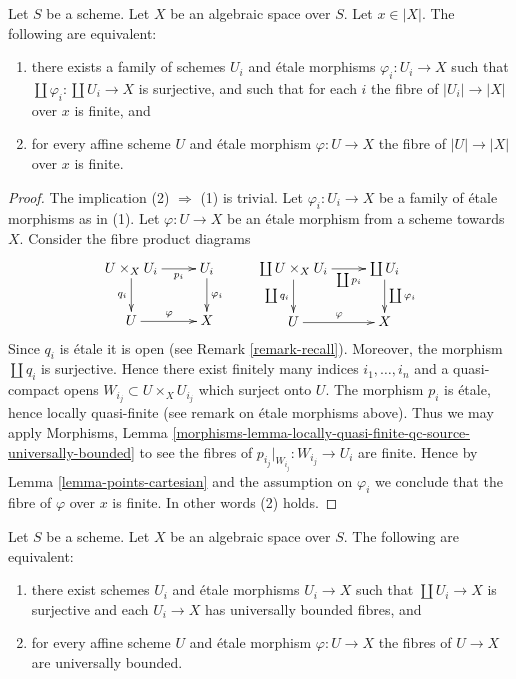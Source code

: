 \begin{lemma}
\label{lemma-U-finite-above-x}
Let $S$ be a scheme. Let $X$ be an algebraic space over $S$.
Let $x \in |X|$. The following are equivalent:
\begin{enumerate}
\item there exists a family of schemes $U_i$ and
\'etale morphisms $\varphi_i : U_i \to X$ such that
$\coprod \varphi_i : \coprod U_i \to X$ is surjective,
and such that for each $i$ the fibre of
$|U_i| \to |X|$ over $x$ is finite, and
\item for every affine scheme $U$ and \'etale morphism $\varphi : U \to X$
the fibre of $|U| \to |X|$ over $x$ is finite.
\end{enumerate}
\end{lemma}

\begin{proof}
The implication (2) $\Rightarrow$ (1) is trivial.
Let $\varphi_i : U_i \to X$ be a family of \'etale morphisms as in (1).
Let $\varphi : U \to X$ be an \'etale morphism from a scheme
towards $X$. Consider the fibre product diagrams
$$
\xymatrix{
U \times_X U_i \ar[r]_-{p_i} \ar[d]_{q_i} & U_i \ar[d]^{\varphi_i} \\
U \ar[r]^\varphi & X
}
\quad \quad
\xymatrix{
\coprod U \times_X U_i \ar[r]_-{\coprod p_i} \ar[d]_{\coprod q_i} &
\coprod U_i \ar[d]^{\coprod \varphi_i} \\
U \ar[r]^\varphi & X
}
$$
Since $q_i$ is \'etale it is open (see Remark \ref{remark-recall}).
Moreover, the morphism $\coprod q_i$ is surjective.
Hence there exist finitely many indices $i_1, \ldots, i_n$ and
a quasi-compact opens $W_{i_j} \subset U \times_X U_{i_j}$
which surject onto $U$.
The morphism $p_i$ is \'etale, hence locally quasi-finite (see remark on
\'etale morphisms above). Thus we may apply
Morphisms, Lemma
\ref{morphisms-lemma-locally-quasi-finite-qc-source-universally-bounded}
to see the fibres of $p_{i_j}|_{W_{i_j}} : W_{i_j} \to U_i$ are finite.
Hence by
Lemma \ref{lemma-points-cartesian}
and the assumption on $\varphi_i$ we conclude that the fibre 
of $\varphi$ over $x$ is finite. In other words (2) holds.
\end{proof}

\begin{lemma}
\label{lemma-U-universally-bounded}
Let $S$ be a scheme. Let $X$ be an algebraic space over $S$.
The following are equivalent:
\begin{enumerate}
\item there exist schemes $U_i$ and \'etale morphisms
$U_i \to X$ such that $\coprod U_i \to X$ is surjective and
each $U_i \to X$ has universally bounded fibres, and
\item for every affine scheme $U$ and \'etale morphism $\varphi : U \to X$
the fibres of $U \to X$ are universally bounded.
\end{enumerate}
\end{lemma}

